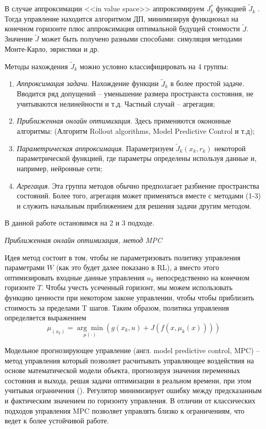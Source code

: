 В случае аппроксимации <<in value space>> аппроксимируем $J_k^*$  функцией
$\widetilde{J}_k$ . Тогда управление находится алгоритмом ДП, минимизируя функционал на конечном горизонте плюс аппроксимация оптимальной будущей стоимости $\widetilde{J}$. Значение $\widetilde{J}$  может быть получено разными способами: симуляция методами Монте-Карло, эвристики и др.

Методы нахождения $\widetilde{J}_k$ можно условно классифицировать на 4 группы:

\begin{enumerate}[1.]
	\item \textit{Аппроксимация задачи}. Нахождение функции $\widetilde{J}_k$ в более простой задаче. Вводится ряд допущений -- уменьшение размера пространста состояния, не учитываются нелинейности и т.д. Частный случай -- агрегация;
	\item \textit{Приближенная онлайн оптимизация}. Здесь применяются окононные алгоритмы: (Алгоритм Rollout algorithms, Model Predictive Control и т.д);
	\item \textit{Параметрическая аппроксимация}. Параметризуем $\widetilde{J}_k(x_k, r_k)$ некоторой параметрической функцией, где параметры определены используя данные и, например, нейронные сети;
	\item \textit{Агрегация}. Эта группа методов обычно предполагает разбиение пространства состояний. Более того, агрегация может применяться вместе с методами (1-3) и служить начальным приближением для решения задачи другим методом.
\end{enumerate}

В данной работе остановимся на 2 и 3 подходе.


\textit{Приближенная онлайн оптимизация, метод MPC}

Идея метод состоит в том, чтобы не параметризовать политику управления параметрами $W$ (как это будет далее показано в RL), а вместо этого оптимизировать входные данные управления $u_k$ непосредственно на конечном горизонте $T$. Чтобы учесть усеченный горизонт, мы можем использовать функцию ценности при некотором законе управлении, чтобы чтобы приблизить стоимость за пределами T шагов. Таким образом, политика управления определяется выражением
\begin{equation*}
	\mu_(x_k) = \underset{\mu(\cdot)}{\arg\min}(g(x_k, u)  + J(f(x,\mu_k(x))))
\end{equation*}

Модельное прогнозирующее управление (англ. model predictive control, MPC) -- метод управления который позволяет расчитывать управляющее воздействия на основе  математической модели объекта, прогнозируя значения переменных состояния и выхода, решая задачи оптимизации в реальном времени, при этом учитывая ограничения (). Регулятор минимизирует ошибку между предсказанным и фактическим значением по горизонту управления. В отличии от классических подходов управления MPC позволяет управлять близко к ограничениям, что ведет к более устойчивой работе.

